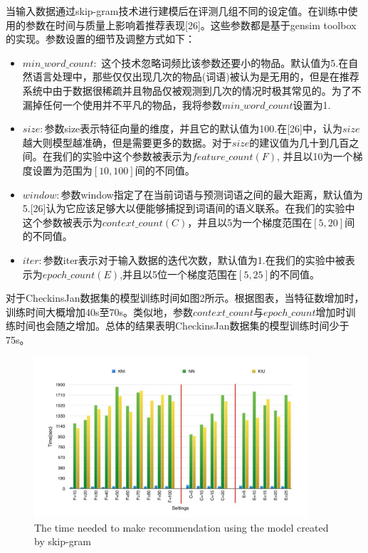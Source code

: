 \documentclass[UTF8]{ctexart}
\begin{document}
	当输入数据通过skip-gram技术进行建模后在评测几组不同的设定值。在训练中使用的参数在时间与质量上影响着推荐表现[26]。这些参数都是基于gensim toolbox的实现。参数设置的细节及调整方式如下：
	\begin{itemize}
		\item $min\_ word \_count:$ 这个技术忽略词频比该参数还要小的物品。默认值为5.在自然语言处理中，那些仅仅出现几次的物品(词语)被认为是无用的，但是在推荐系统中由于数据很稀疏并且物品仅被观测到几次的情况时极其常见的。为了不漏掉任何一个使用并不平凡的物品，我将参数$min\_word\_count$设置为1.
		\item $size:$参数size表示特征向量的维度，并且它的默认值为100.在[26]中，认为$size$越大则模型越准确，但是需要更多的数据。对于$size$的建议值为几十到几百之间。在我们的实验中这个参数被表示为$feature\_count\left(F\right)$, 并且以10为一个梯度设置为范围为$[10,100]$间的不同值。
		\item $window:$参数window指定了在当前词语与预测词语之间的最大距离，默认值为5.[26]认为它应该足够大以便能够捕捉到词语间的语义联系。在我们的实验中这个参数被表示为$context\_count\left(C\right)$，并且以5为一个梯度范围在$\left[5,20\right]$间的不同值。
		\item $iter:$参数iter表示对于输入数据的迭代次数，默认值为1.在我们的实验中被表示为$epoch\_count\left(E\right)$,并且以5位一个梯度范围在$\left[5,25\right]$的不同值。
	\end{itemize}
	
	对于CheckinsJan数据集的模型训练时间如图2所示。根据图表，当特征数增加时，训练时间大概增加40s至70s。类似地，参数$context\_count$与$epoch\_count$增加时训练时间也会随之增加。总体的结果表明CheckinsJan数据集的模型训练时间少于75s。
	\begin{figure}
		\begin{center}
			\includegraphics[width=4in]{3}
		\end{center}
		\caption{The time needed to make recommendation using the model created by skip-gram}
	\end{figure}
	
\end{document}
